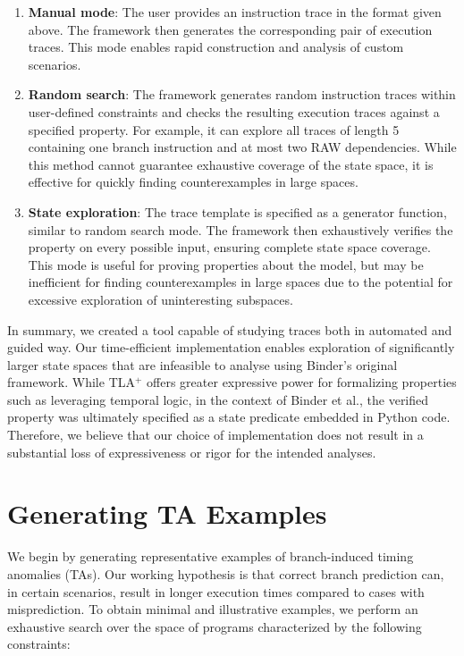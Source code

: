 \begin{enumerate}
	\item \textbf{Manual mode}: The user provides an instruction trace in the format given above. The framework then generates the corresponding pair of execution traces. This mode enables rapid construction and analysis of custom scenarios.
	\item \textbf{Random search}: The framework generates random instruction traces within user-defined constraints and checks the resulting execution traces against a specified property. For example, it can explore all traces of length 5 containing one branch instruction and at most two RAW dependencies. While this method cannot guarantee exhaustive coverage of the state space, it is effective for quickly finding counterexamples in large spaces.
	\item \textbf{State exploration}: The trace template is specified as a generator function, similar to random search mode. The framework then exhaustively verifies the property on every possible input, ensuring complete state space coverage. This mode is useful for proving properties about the model, but may be inefficient for finding counterexamples in large spaces due to the potential for excessive exploration of uninteresting subspaces.
\end{enumerate}


In summary, we created a tool capable of studying traces both in automated and guided way. Our time-efficient implementation enables exploration of significantly larger state spaces that are infeasible to analyse using Binder's original framework. While TLA$^+$ offers greater expressive power for formalizing properties such as leveraging temporal logic, in the context of Binder et al., the verified property was ultimately specified as a state predicate embedded in Python code. Therefore, we believe that our choice of implementation does not result in a substantial loss of expressiveness or rigor for the intended analyses.

\section{Generating TA Examples}

We begin by generating representative examples of branch-induced timing anomalies (TAs). Our working hypothesis is that correct branch prediction can, in certain scenarios, result in longer execution times compared to cases with misprediction. To obtain minimal and illustrative examples, we perform an exhaustive search over the space of programs characterized by the following constraints:


